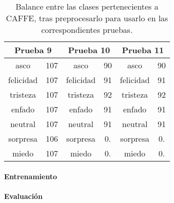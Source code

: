 \documentclass[11pt,a4paper,spanish]{book}
\begin{document}
	\begin{table}[H]
		\centering
		\begin{center}
			\begin{tabular}{ c  c | c  c |c  c }
				\multicolumn{2}{c|}{Prueba 9} &
				\multicolumn{2}{|c|}{Prueba 10} &
				\multicolumn{2}{|c}{Prueba 11} \\
				\hline
				asco 		& 107 & asco 		& 90 & asco 	  & 90	\\
				felicidad 	& 107 & felicidad 	& 91 & felicidad  & 91	\\
				tristeza 	& 107 & tristeza 	& 92 & tristeza   & 92	\\
				enfado 		& 107 & enfado 		& 91 & enfado 	  & 91	\\
				neutral 	& 107 & neutral 	& 91 & neutral 	  & 91	\\
				sorpresa 	& 106 & sorpresa 	& 0. & sorpresa   & 0. 	\\
				miedo 		& 107 & miedo		& 0. & miedo 	  & 0. 	\\
				\hline
			\end{tabular}
			
			\caption{Balance entre las clases pertenecientes a CAFFE, tras preprocesarlo para usarlo en las correspondientes pruebas.}
			\label{ref:balanceTest91011}
		\end{center}
	\end{table}
	
	\paragraph{Entrenamiento}
	\paragraph{Evaluación}
	
\end{document}

